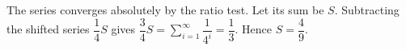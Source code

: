 The series converges absolutely by the ratio test. Let its sum be $S$. Subtracting the shifted series $\dfrac{1}{4}S$ gives $\dfrac{3}{4}S=\sum_{i=1}^{\infty}\dfrac{1}{4^i}=\dfrac{1}{3}$. Hence $\boxed{S=\dfrac{4}{9}}$.
